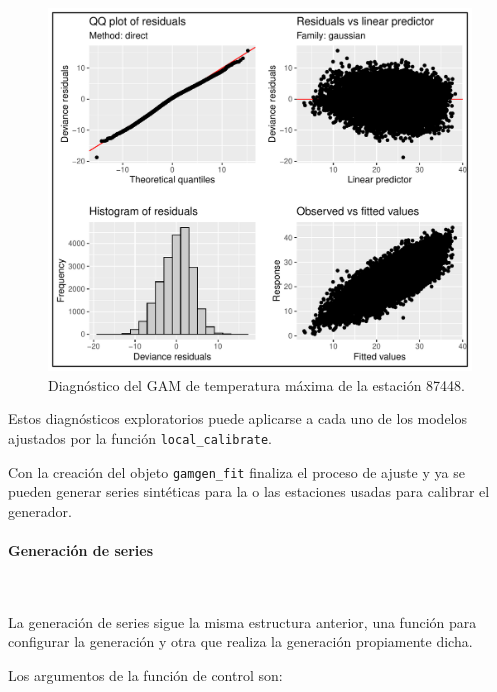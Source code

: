 \documentclass[
  12pt]{article}
\begin{document}
\begin{figure}[H]

{\centering \includegraphics{Manual_Generador_files/figure-latex/diagnostico-modelo-local-seasonal-ind-1} 

}

\caption{Diagnóstico del GAM de temperatura máxima de la estación 87448.}\label{fig:diagnostico-modelo-local-seasonal-ind}
\end{figure}

Estos diagnósticos exploratorios puede aplicarse a cada uno de los modelos ajustados por la función \texttt{local\_calibrate}.

Con la creación del objeto \texttt{gamgen\_fit} finaliza el proceso de ajuste y ya se pueden generar series sintéticas para la o las estaciones usadas para calibrar el generador.

\hypertarget{generaciuxf3n-de-series-1}{%
\paragraph{Generación de series}\label{generaciuxf3n-de-series-1}}

~

La generación de series sigue la misma estructura anterior, una función para configurar la generación y otra que realiza la generación propiamente dicha.

Los argumentos de la función de control son:
\end{document}
